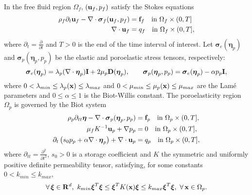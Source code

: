 \documentclass[11pt]{article}
\def\u{{\bf u}}
\def\f{{\bf f}}
\def\x{{\bf x}}
\def\bbeta{\boldsymbol{\eta}}
\def\bs{\boldsymbol{\sigma}}
\def\bxi{\boldsymbol{\xi}}
\def\D{{\bf D}}
\def\bI{{\bf I}}
\def\d{\partial}
\def\R{{\bf R}}
\def\grad{\nabla}
\def\div{\grad\cdot}
\def\O{\Omega}
\begin{document}
In the free fluid region $\O_f$, $(\u_f,p_f)$ satisfy 
the Stokes equations
%
\begin{align}
	\rho_f {\partial_t \u_f}-\div \bs_f(\u_f,p_f)  &= \f_f \quad \mbox{in } \O_f \times (0,T] \label{stokes1} \\
	 \div \u_f &=  q_f   \quad \mbox{in } \O_f \times (0,T], \label{stokes2}
\end{align}
%
where  $\d_t = \frac{\d}{\d t}$ and $T > 0$ is the end of the time interval of interest.
Let $\bs_e(\bbeta_p)$ and $\bs_p(\bbeta_p,p_p)$ be the elastic and poroelastic stress tensors, 
respectively:
%
\begin{equation}\label{stress-defn}
	\bs_e(\bbeta_p) = \lambda_p (\div \bbeta_p) \bI + 2\mu_p \D(\bbeta_p), \qquad
	\bs_p(\bbeta_p,p_p) = \bs_e(\bbeta_p) - \alpha p_p \bI,
\end{equation}
%
where $ 0 < \lambda_{min} \le \lambda_p(\x) \le \lambda_{max}$ and 
$0 < \mu_{min} \le \mu_p(\x) \le \mu_{max} $ are the Lam\'{e} parameters and 
$0 \le \alpha \le 1$ is the Biot-Willis constant. 
The poroelasticity region $\O_p$ is governed by the Biot system \cite{b1941}
%
\begin{eqnarray}
\rho_p {\partial_{tt} \bbeta}- \div \bs_p(\bbeta_p,p_p) &= \f_p \quad \mbox{in } \O_p\times (0,T],  \label{eq:biot0} \\
\mu_{f} K^{-1}\u_p + \grad p_p &= 0 \quad \mbox{in } \O_p\times (0,T], \label{eq:biot1}\\ 
	{\d_t} \left(s_0 p_p + \alpha \div \bbeta_p\right) + \div \u_p &= q_p 
	\quad \mbox{in } \O_p\times (0,T], \label{eq:biot2}
\end{eqnarray}
%
where $\d_{tt} = \frac{\d^2}{\d t^2}$, $s_0 > 0$ is a storage coefficient and $K$ the symmetric and uniformly positive definite permeability tensor, satisfying, for some constants 
$0 < k_{min} \le k_{max}$,
%
$$
\forall \, \bxi \in \R^d, \,\,  
k_{min} \bxi^T\bxi \le \bxi^T K(\x) \bxi \le k_{max} \bxi^T\bxi, \,\, \forall \, 
\x \in \Omega_p.
$$
\end{document}
